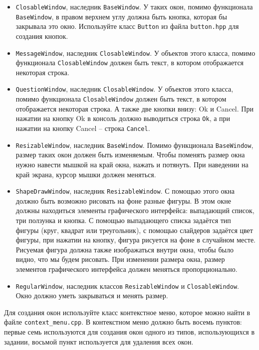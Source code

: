 \documentclass{article}
\begin{document}
\begin{itemize}

\item \texttt{ClosableWindow}, наследник \texttt{BaseWindow}.
У таких окон, помимо функционала \texttt{BaseWindow}, в правом верхнем углу должна быть кнопка, которая бы закрывала это окно. Используйте класс \texttt{Button} из файла \texttt{button.hpp} для создания кнопок.

\item \texttt{MessageWindow}, наследник \texttt{ClosableWindow}.
У объектов этого класса, помимо функционала \texttt{ClosableWindow} должен быть текст, в котором отображается некоторая строка. 

\item \texttt{QuestionWindow}, наследник \texttt{ClosableWindow}.
У объектов этого класса, помимо функционала \texttt{ClosableWindow} должен быть текст, в котором отображается некоторая строка. А также две кнопки внизу: Ok и Cancel. При нажатии на кнопку Ok в консоль должно выводиться строка \texttt{Ok}, а при нажатии на кнопку Cancel -- строка \texttt{Cancel}.


\item \texttt{ResizableWindow}, наследник \texttt{BaseWindow}.
Помимо функционала \texttt{BaseWindow}, размер таких окон должен быть изменяемым. Чтобы поменять размер окна нужно навести мышкой на край окна, нажать и потянуть. При наведении на край экрана, курсор мышки должен меняться.

\item \texttt{ShapeDrawWindow}, наследник \texttt{ResizableWindow}.
С помощью этого окна должно быть возможно рисовать на фоне разные фигуры. В этом окне должны находиться элементы графического интерфейса: выпадающий список, три ползунка и кнопка. С помощью выпадающего списка задаётся тип фигуры (круг, квадрат или треугольник), с помощью слайдеров задаётся цвет фигуры, при нажатии на кнопку, фигура рисуется на фоне в случайном месте. Рисуемая фигура должна также изображаться внутри окна, чтобы было видно, что мы будем рисовать. При изменении размера окна, размер элементов графического интерфейса должен меняться пропорционально.

\item \texttt{RegularWindow}, наследник классов \texttt{ResizableWindow} и \texttt{ClosableWindow}. Окно должно уметь закрываться и менять размер.
\end{itemize}
Для создания окон используйте класс контекстное меню, которое можно найти в файле \texttt{context\_menu.cpp}. В контекстном меню должно быть восемь пунктов: первые семь используются для создания окон одного из типов, использующихся в задании, восьмой пункт используется для удаления всех окон.
\end{document}
